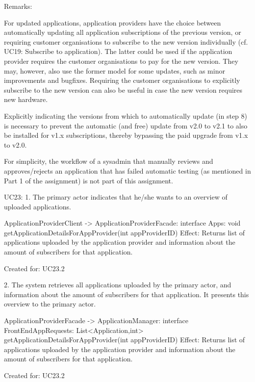         Remarks:
            { For updated applications, application providers have the choice between automatically updating
              all application subscriptions of the previous version, or requiring customer organisations
              to subscribe to the new version individually (cf. UC19: Subscribe to application). The latter
              could be used if the application provider requires the customer organisations to pay for the
              new version. They may, however, also use the former model for some updates, such as minor
              improvements and bugfixes. Requiring the customer organisations to explicitly subscribe to
              the new version can also be useful in case the new version requires new hardware.
            { Explicitly indicating the versions from which to automatically update (in step 8) is necessary
              to prevent the automatic (and free) update from v2.0 to v2.1 to also be installed for v1.x
              subscriptions, thereby bypassing the paid upgrade from v1.x to v2.0.
            { For simplicity, the workflow of a sysadmin that manually reviews and approves/rejects an
              application that has failed automatic testing (as mentioned in Part 1 of the assignment) is not
              part of this assignment.


    UC23:
        1. The primary actor indicates that he/she wants to an overview of uploaded applications.

            ApplicationProviderClient -> ApplicationProviderFacade: interface Apps:
                                                    void getApplicationDetailsForAppProvider(int appProviderID)
                Effect: Returns list of applications uploaded by the application provider and information about the amount of subscribers
                        for that application.
                \item Created for: UC23.2

        2. The system retrieves all applications uploaded by the primary actor, and information about the amount of subscribers for that
           application. It presents this overview to the primary actor.

            ApplicationProviderFacade -> ApplicationManager: interface FrontEndAppRequests:
                                                List<Application,int> getApplicationDetailsForAppProvider(int appProviderID)
                Effect: Returns list of applications uploaded by the application provider and information about the amount of subscribers
                        for that application.
                \item Created for: UC23.2

}}}
